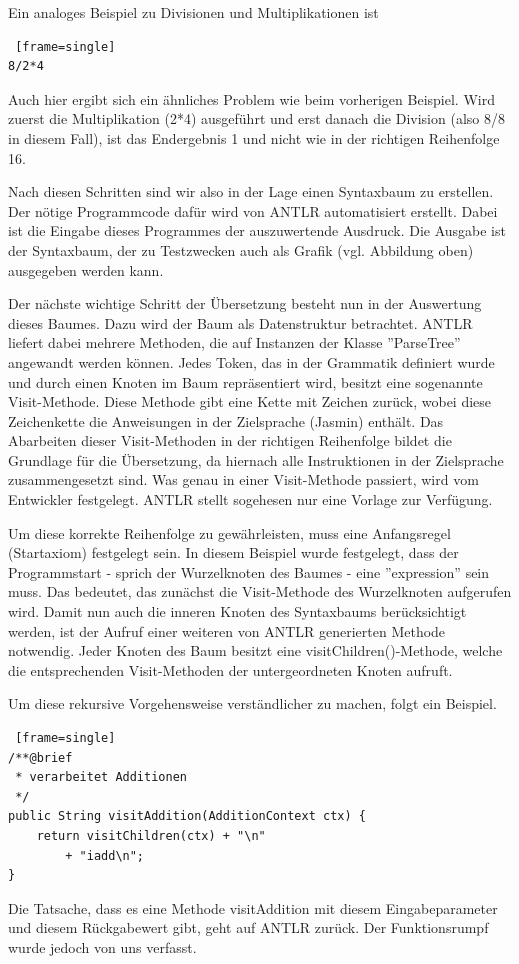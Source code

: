 Ein analoges Beispiel zu Divisionen und Multiplikationen ist
\begin{lstlisting} [frame=single]
8/2*4
\end{lstlisting}
Auch hier ergibt sich ein ähnliches Problem wie beim vorherigen Beispiel. Wird zuerst die Multiplikation (2*4) ausgeführt und erst danach die Division (also 8/8 in diesem Fall), ist das Endergebnis 1 und nicht wie in der richtigen Reihenfolge 16.

Nach diesen Schritten sind wir also in der Lage einen Syntaxbaum zu erstellen. Der nötige Programmcode dafür wird von ANTLR automatisiert erstellt. Dabei ist die Eingabe dieses Programmes der auszuwertende Ausdruck. Die Ausgabe ist der Syntaxbaum, der zu Testzwecken auch als Grafik (vgl. Abbildung oben) ausgegeben werden kann. 

Der nächste wichtige Schritt der Übersetzung besteht nun in der Auswertung dieses Baumes. Dazu wird der Baum als Datenstruktur betrachtet. ANTLR liefert dabei mehrere Methoden, die auf Instanzen der Klasse ''ParseTree'' angewandt werden können. 
Jedes Token, das in der Grammatik definiert wurde und durch einen Knoten im Baum repräsentiert wird, besitzt eine sogenannte Visit-Methode. Diese Methode gibt eine Kette mit Zeichen zurück, wobei diese Zeichenkette die Anweisungen in der Zielsprache (Jasmin) enthält. Das Abarbeiten dieser Visit-Methoden in der richtigen Reihenfolge bildet die Grundlage für die Übersetzung, da hiernach alle Instruktionen in der Zielsprache zusammengesetzt sind. Was genau in einer Visit-Methode passiert, wird vom Entwickler festgelegt. ANTLR stellt sogehesen nur eine Vorlage zur Verfügung.

Um diese korrekte Reihenfolge zu gewährleisten, muss eine Anfangsregel (Startaxiom) festgelegt sein. In diesem Beispiel wurde festgelegt, dass der Programmstart - sprich der Wurzelknoten des Baumes - eine ''expression'' sein muss. Das bedeutet, das zunächst die Visit-Methode des Wurzelknoten aufgerufen wird. Damit nun auch die inneren Knoten des Syntaxbaums berücksichtigt werden, ist der Aufruf einer weiteren von ANTLR generierten Methode notwendig. Jeder Knoten des Baum besitzt eine visitChildren()-Methode, welche die entsprechenden Visit-Methoden der untergeordneten Knoten aufruft.

Um diese rekursive Vorgehensweise verständlicher zu machen, folgt ein Beispiel.


\begin{lstlisting} [frame=single]
/**@brief
 * verarbeitet Additionen
 */
public String visitAddition(AdditionContext ctx) {
	return visitChildren(ctx) + "\n"
		+ "iadd\n";
}
\end{lstlisting}
\pagebreak
Die Tatsache, dass es eine Methode visitAddition mit diesem Eingabeparameter und diesem Rückgabewert gibt, geht auf ANTLR zurück. Der Funktionsrumpf wurde jedoch von uns verfasst.

